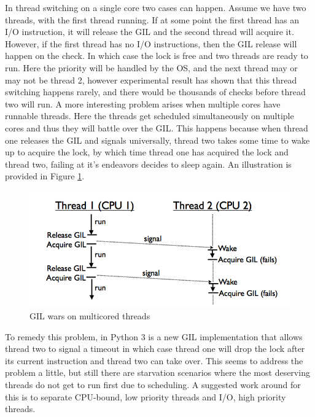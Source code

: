 \documentclass[10pt,twocolumn,letterpaper]{article}
\begin{document}
In thread switching on a single core two cases can happen. Assume
we have two threads, with the first thread running. If at some point
the first thread has an I/O instruction, it will release the GIL and
the second thread will acquire it. However, if the first thread has
no I/O instructions, then the GIL release will happen on the check.
In which case the lock is free and two threads are ready to run. Here
the priority will be handled by the OS, and the next thread may or
may not be thread 2, however experimental result has shown that this
thread switching happens rarely, and there would be thousands of checks
before thread two will run. A more interesting problem arises when
multiple cores have runnable threads. Here the threads get scheduled
simultaneously on multiple cores and thus they will battle over the
GIL. This happens because when thread one releases the GIL and signals
universally, thread two takes some time to wake up to acquire the
lock, by which time thread one has acquired the lock and thread two,
failing at it's endeavors decides to sleep again. An illustration
is provided in Figure \ref{fig:GIL-wars-on}.

\begin{figure}[htbp] 
\begin{center}
\includegraphics[scale=0.3]{figure/threads_multicore.png}
\end{center}
\caption{GIL wars on multicored threads}
\label{fig:GIL-wars-on}
\end{figure}


To remedy this problem, in Python 3 is a new GIL implementation that
allows thread two to signal a timeout in which case thread one will
drop the lock after its current instruction and thread two can take
over. This seems to address the problem a little, but still there
are starvation scenarios where the most deserving threads do not get
to run first due to scheduling. A suggested work around for this is
to separate CPU-bound, low priority threads and I/O, high priority
threads. 
\end{document}

